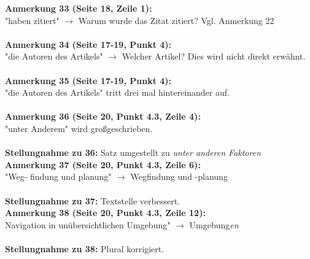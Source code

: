 \documentclass[a4paper,12pt]{book}
\begin{document}
\noindent
\textbf{Anmerkung 33 (Seite 18, Zeile 1):}\\
"haben zitiert" $\rightarrow$ Warum wurde das Zitat zitiert? Vgl. Anmerkung 22 \\
\\

\noindent
\textbf{Anmerkung 34 (Seite 17-19, Punkt 4):}\\
"die Autoren des Artikels" $\rightarrow$ Welcher Artikel? Dies wird nicht direkt erwähnt. \\
\\

\noindent
\textbf{Anmerkung 35 (Seite 17-19, Punkt 4):}\\
"die Autoren des Artikels" tritt drei mal hintereinander auf. \\
\\

\noindent
\textbf{Anmerkung 36 (Seite 20, Punkt 4.3, Zeile 4):}\\
"unter Anderem" wird großgeschrieben.\\
\\
\textbf{Stellungnahme zu 36:}
Satz umgestellt zu \emph{unter anderen Faktoren}\\

\noindent
\textbf{Anmerkung 37 (Seite 20, Punkt 4.3, Zeile 6):}\\
"Weg- findung und planung" $\rightarrow$ Wegfindung und -planung \\
\\
\textbf{Stellungnahme zu 37:}
Textstelle verbessert.
\\

\noindent
\textbf{Anmerkung 38 (Seite 20, Punkt 4.3, Zeile 12):}\\
Navigation in unübersichtlichen Umgebung" $\rightarrow$ Umgebung\emph{en} \\
\\
\textbf{Stellungnahme zu 38:}
Plural korrigiert.
\\
\end{document}
